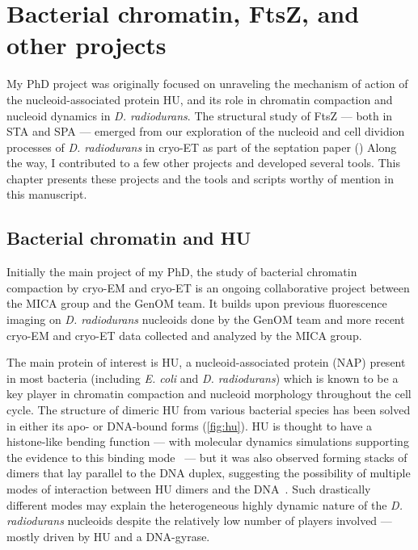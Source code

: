 \chapter{Bacterial chromatin, FtsZ, and other projects}\label{other_projects}

My PhD project was originally focused on unraveling the mechanism of action of the nucleoid-associated protein HU, and its role in chromatin compaction and nucleoid dynamics in \textit{D. radiodurans}.
The structural study of FtsZ --- both in STA and SPA --- emerged from our exploration of the nucleoid and cell dividion processes of \textit{D. radiodurans} in cryo-ET as part of the septation paper ()
Along the way, I contributed to a few other projects and developed several tools.
This chapter presents these projects and the tools and scripts worthy of mention in this manuscript.

\localtableofcontents

\section{Bacterial chromatin and HU}\label{hu}

Initially the main project of my PhD, the study of bacterial chromatin compaction by cryo-EM and cryo-ET is an ongoing collaborative project between the MICA group and the GenOM team.
It builds upon previous fluorescence imaging on \textit{D. radiodurans} nucleoids done by the GenOM team and more recent cryo-EM and cryo-ET data collected and analyzed by the MICA group.

The main protein of interest is HU, a nucleoid-associated protein (NAP) present in most bacteria (including \textit{E. coli} and \textit{D. radiodurans}) which is known to be a key player in chromatin compaction and nucleoid morphology throughout the cell cycle.
The structure of dimeric HU from various bacterial species has been solved in either its apo- or DNA-bound forms (\autoref{fig:hu}).
HU is thought to have a histone-like bending function --- with molecular dynamics simulations supporting the evidence to this binding mode~\cite{hognonMolecularBasesDNA2019} --- but it was also observed forming stacks of dimers that lay parallel to the DNA duplex, suggesting the possibility of multiple modes of interaction between HU dimers and the DNA~\cite{hammelHUMultimerizationShift2016}.
Such drastically different modes may explain the heterogeneous highly dynamic nature of the \textit{D. radiodurans} nucleoids despite the relatively low number of players involved --- mostly driven by HU and a DNA-gyrase.

